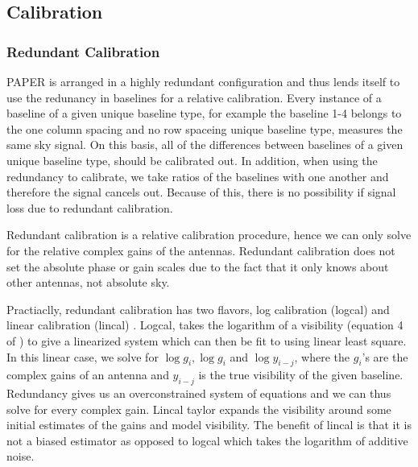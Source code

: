 \documentclass[twocolumn,numberedappendix]{emulateapj}
\begin{document}
\subsection{Calibration}
\subsubsection{Redundant Calibration}
%
%
%    
%

PAPER is arranged in a highly redundant configuration and thus lends itself to
use the redunancy in baselines for a relative calibration. Every instance of a
baseline of a given unique baseline type, for example the baseline 1-4 belongs
to the one column spacing and no row spaceing unique baseline type, measures the
same sky signal. On this basis, all of the differences between baselines of a
given unique baseline type, should be calibrated out. In addition, when using
the redundancy to calibrate, we take ratios of the baselines with one another
and therefore the signal cancels out. Because of this, there is no possibility
if signal loss due to redundant calibration.

Redundant calibration is a relative calibration procedure, hence we can only
solve for the relative complex gains of the antennas. Redundant calibration does
not set the absolute phase or gain scales due to the fact that it only knows
about other antennas, not absolute sky.  

Practiaclly, redundant calibration has two flavors, log calibration (logcal) and linear
calibration (lincal) \cite{liu_et_al2010,zheng_et_al2014}. Logcal, takes the
logarithm of a visibility (equation 4 of \cite{zheng_et_al2014}) to give a
linearized system which can then be fit to using linear least square. In this
linear case, we solve for $\log{g_{i}},\log{g_{i}}$ and $\log{y_{i-j}}$, where
the $g_{i}$'s are the complex gains of an antenna and $y_{i-j}$ is the true
visibility of the given baseline. Redundancy gives us an overconstrained system
of equations and we can thus solve for every complex gain. Lincal taylor expands
the visibility around some initial estimates of the gains and model visibility.
The benefit of lincal is that it is not a biased estimator as opposed to logcal
which takes the logarithm of additive noise.
\end{document}
